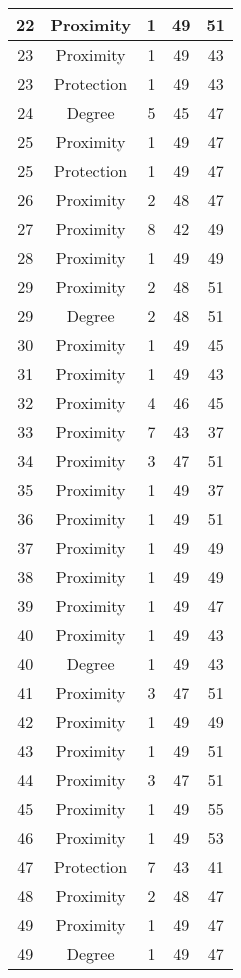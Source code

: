 \documentclass[results.tex]{subfiles}
\begin{document}
\begin{center}
\begin{tabular}{| c || c | c | c | c |}
    \hline
    22 & Proximity & 1 & 49 & 51 \\ 
    \hline
    23 & Proximity & 1 & 49 & 43 \\ 
    \hline
    23 & Protection & 1 & 49 & 43 \\ 
    \hline
    24 & Degree & 5 & 45 & 47 \\ 
    \hline
    25 & Proximity & 1 & 49 & 47 \\ 
    \hline
    25 & Protection & 1 & 49 & 47 \\ 
    \hline
    26 & Proximity & 2 & 48 & 47 \\ 
    \hline
    27 & Proximity & 8 & 42 & 49 \\ 
    \hline
    28 & Proximity & 1 & 49 & 49 \\ 
    \hline
    29 & Proximity & 2 & 48 & 51 \\ 
    \hline
    29 & Degree & 2 & 48 & 51 \\ 
    \hline
    30 & Proximity & 1 & 49 & 45 \\ 
    \hline
    31 & Proximity & 1 & 49 & 43 \\ 
    \hline
    32 & Proximity & 4 & 46 & 45 \\ 
    \hline
    33 & Proximity & 7 & 43 & 37 \\ 
    \hline
    34 & Proximity & 3 & 47 & 51 \\ 
    \hline
    35 & Proximity & 1 & 49 & 37 \\ 
    \hline
    36 & Proximity & 1 & 49 & 51 \\ 
    \hline
    37 & Proximity & 1 & 49 & 49 \\ 
    \hline
    38 & Proximity & 1 & 49 & 49 \\ 
    \hline
    39 & Proximity & 1 & 49 & 47 \\ 
    \hline
    40 & Proximity & 1 & 49 & 43 \\ 
    \hline
    40 & Degree & 1 & 49 & 43 \\ 
    \hline
    41 & Proximity & 3 & 47 & 51 \\ 
    \hline
    42 & Proximity & 1 & 49 & 49 \\ 
    \hline
    43 & Proximity & 1 & 49 & 51 \\ 
    \hline
    44 & Proximity & 3 & 47 & 51 \\ 
    \hline
    45 & Proximity & 1 & 49 & 55 \\ 
    \hline
    46 & Proximity & 1 & 49 & 53 \\ 
    \hline
    47 & Protection & 7 & 43 & 41 \\ 
    \hline
    48 & Proximity & 2 & 48 & 47 \\ 
    \hline
    49 & Proximity & 1 & 49 & 47 \\ 
    \hline
    49 & Degree & 1 & 49 & 47 \\ 
    \hline   \end{tabular}
\end{center}
\end{document}
